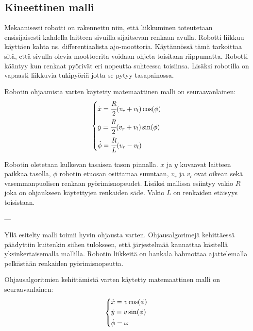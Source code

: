 \documentclass[]{article} %
\numberwithin{equation}{section}
\numberwithin{figure}{section}
\numberwithin{table}{section}
\begin{document}
\subsection{Kineettinen malli}
\label{sub:Kineettinen malli}

Mekaanisesti robotti on rakennettu niin, että liikkuminen toteutetaan ensisijaisesti kahdella laitteen sivuilla sijaitsevan renkaan avulla.
Robotti liikkuu käyttäen kahta ns. differentiaalista ajo-moottoria.
Käytännössä tämä tarkoittaa sitä, että sivulla olevia moottoerita voidaan ohjeta toisitaan riippumatta.
Robotti kääntyy kun renkaat pyörivät eri nopeutta suhteessa toisiinsa.
Lisäksi robotilla on vapaasti liikkuvia tukipyöriä jotta se pytyy tasapainossa.

Robotin ohjaamista varten käytetty matemaattinen malli on seuraavanlainen:
\begin{align}
    \label{equ:diff-drive-implementation}
    \begin{dcases}
        \dot x = \cfrac{R}{2} (v_r + v_l) \cos (\phi)\\
        \dot y = \cfrac{R}{2} (v_r + v_l) \sin (\phi)\\
        \dot \phi = \cfrac{R}{L} (v_r - v_l)   
    \end{dcases}
\end{align}

Robotin oletetaan kulkevan tasaisen tason pinnalla. $x$ ja $y$ kuvaavat laitteen paikkaa tasolla, $\phi$ robotin etuosan osittamaa suuntaan, $v_r$ ja $v_l$ ovat oikean sekä vasemmanpuolisen renkaan pyörimisnopeudet. Lisäksi mallissa esiintyy vakio $R$ joka on ohjaukseen käytettyjen renkaiden säde. Vakio $L$ on renkaiden etäisyys toisistaan.


---

Yllä esitelty malli toimii hyvin ohjausta varten.
Ohjausalgorimejä kehittäessä päädyttiin kuitenkin siihen tulokseen, että järjestelmää kannattaa käsitellä  yksinkertaisemalla mallilla. Robotin liikkeitä on hankala hahmottaa ajattelemalla pelkästään renkaiden pyörimisnopeutta.

Ohjausalgoritmien kehittämistä varten käytetty matemaattinen malli on seuraavanlainen:
\begin{align}
    \label{equ:diff-drive-design}
    \begin{dcases}
        \dot x = v \cos(\phi)\\
        \dot y = v \sin(\phi)\\
        \dot \phi = \omega
    \end{dcases}
\end{align}
\end{document}
